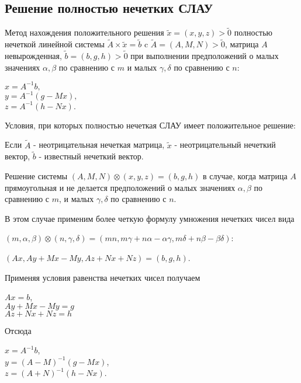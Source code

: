 \documentclass[12pt]{article}
\begin{document}
\subsection{Решение полностью нечетких СЛАУ}

Метод нахождения положительного решения $\tilde{x} = (x, y, z) > \tilde{0}$
полностью нечеткой линейной системы $\tilde{A} \times \tilde{x} = \tilde{b}$ c
$\tilde{A} = (A, M, N) > \tilde{0}$, матрица $A$ невырожденная, $\tilde{b} = (b,
	g, h) > \tilde{0}$ при выполнении предположений о малых значениях $\alpha,
	\beta$ по сравнению с $m$ и малых $\gamma, \delta$ по сравнению с $n$:

\begin{center}
	$x = A^{-1}b, $ \\
	$y = A^{-1}(g - Mx),$ \\
	$z = A^{-1} (h - Nx).$ \\
\end{center}

Условия, при которых полностью нечеткая СЛАУ имеет положительное решение:

Если $\tilde{A}$ - неотрицательная нечеткая матрица, $\tilde{x} $ -
неотрицательный нечеткий вектор, $\tilde{b}$ - известный нечеткий вектор.

\par

Решение системы $(A, M, N) \otimes (x, y, z) = (b, g, h)$ в случае, когда
матрица $A$ прямоугольная и не делается предположений о малых значениях $\alpha,
	\beta$ по сравнению с $m$, и малых $\gamma, \delta$ по сравнению с $n$.

В этом случае применим более четкую формулу умножения нечетких чисел вида

$ (m, \alpha, \beta) \otimes (n, \gamma, \delta) = (mn, m \gamma + n \alpha -
	\alpha \gamma, m \delta + n \beta - \beta \delta )$:

$(Ax, Ay + Mx - My, Az + Nx + Nz) = (b, g, h)$.

Применяя условия равенства нечетких чисел получаем

\begin{center}
	$ Ax = b $, \\
	$ Ay + Mx - My = g $ \\
	$ Az + Nx + Nz = h $ \\
\end{center}

Отсюда

\begin{center}
	$ x = A^{-1}b $, \\
	$ y = (A - M)^{-1} (g - Mx) $, \\
	$ z = (A + N)^{-1} (h - Nx) $.
\end{center}
\end{document}
